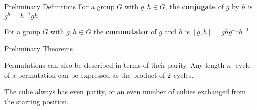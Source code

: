 \documentclass[final]{beamer}
\newlength{\colwidth}
\begin{document}
\begin{frame}[t]
\begin{columns}[t]
\begin{column}{\colwidth}
\begin{alertblock}{Preliminary Definitions}
For a group $G$ with $g,h \in G$, the \textbf{conjugate} of $g$ by $h$ is
$g^h = h^{-1}gh$ 

For a group $G$ with $g,h \in G$ 
the \textbf{commutator} of $g$ and $h$ is 
$[g,h]=ghg^{-1}h^{-1}$







  \end{alertblock}
 
  \begin{block}{Preliminary Theorems}

     Permutations can also be described in terms of their parity. Any length $n$-
cycle of a permutation can be expressed as the product of $2$-cycles.

The cube always has even parity, or an even number of cubies
exchanged from the starting position.


\end{block}
\end{column}
\end{columns}
\end{frame}
\end{document}
